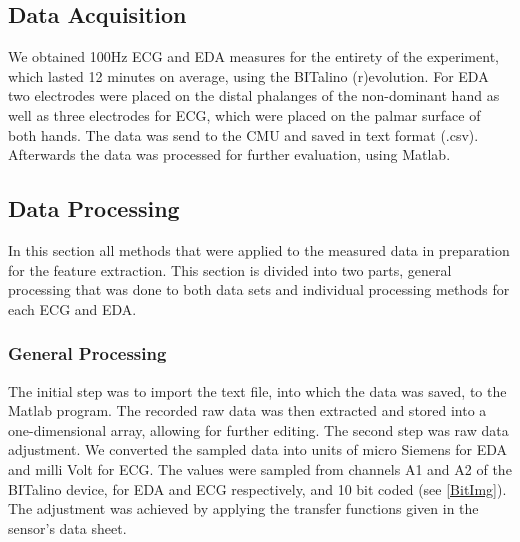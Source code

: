 %

\subsection{Data Acquisition}
We obtained 100Hz ECG and EDA measures for the entirety of the experiment, which lasted 12 minutes on average, using the BITalino (r)evolution. For EDA two electrodes were placed on the distal phalanges of the non-dominant hand as well as three electrodes for ECG, which were placed on the palmar surface of both hands. The data was send to the CMU and saved in text format (.csv). Afterwards the data was processed for further evaluation, using Matlab.

\subsection{Data Processing}
In this section all methods that were applied to the measured data in preparation for the feature extraction. This section is divided into two parts, general processing that was done to both data sets and individual processing methods for each ECG and EDA.

\subsubsection{General Processing}
The initial step was to import the text file, into which the data was saved, to the Matlab program. The recorded raw data was then extracted and stored into a one-dimensional array, allowing for further editing.
The second step was raw data adjustment. We converted the sampled data into units of micro Siemens for EDA and milli Volt for ECG. The values were sampled from channels A1 and A2 of the BITalino device, for EDA and ECG respectively, and 10 bit coded (see \ref{BitImg}).
The adjustment was achieved by applying the transfer functions given in the sensor's data sheet.

